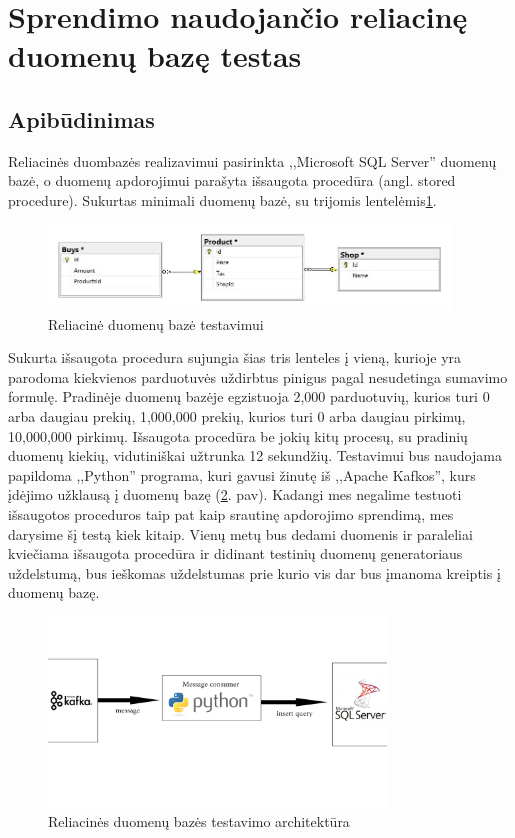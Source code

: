\documentclass{VUMIFPSkursinis}
\begin{document}
\section{Sprendimo naudojančio reliacinę duomenų bazę testas}

\subsection{Apibūdinimas}

Reliacinės duombazės realizavimui pasirinkta ,,Microsoft SQL Server'' duomenų bazė, o duomenų apdorojimui parašyta išsaugota procedūra (angl. stored procedure).
Sukurtas minimali duomenų bazė, su trijomis lentelėmis\ref{fig:dbdiagram}.
\begin{figure}[!htbp]
    \centering
    \includegraphics[width=0.95\textwidth]{img/dbdiagram.jpg}
    \caption{Reliacinė duomenų bazė testavimui}
    \label{fig:dbdiagram}
\end{figure}

Sukurta išsaugota procedura sujungia šias tris lenteles į vieną, kurioje yra parodoma kiekvienos parduotuvės uždirbtus pinigus pagal nesudetinga sumavimo formulę.
Pradinėje duomenų bazėje egzistuoja 2,000 parduotuvių, kurios turi 0 arba daugiau prekių, 1,000,000 prekių, kurios turi 0 arba daugiau pirkimų, 10,000,000 pirkimų.
Išsaugota procedūra be jokių kitų procesų, su pradinių duomenų kiekių, vidutiniškai užtrunka 12 sekundžių. Testavimui bus naudojama papildoma ,,Python'' programa,
kuri gavusi žinutę iš ,,Apache Kafkos'', kurs įdėjimo užklausą į duomenų bazę (\ref{fig:generator}. pav). Kadangi mes negalime testuoti išsaugotos proceduros taip 
pat kaip srautinę apdorojimo sprendimą, mes darysime šį testą kiek kitaip. Vienų metų bus dedami duomenis ir paraleliai kviečiama išsaugota procedūra ir didinant 
testinių duomenų generatoriaus uždelstumą, bus ieškomas uždelstumas prie kurio vis dar bus įmanoma kreiptis į duomenų bazę.

\begin{figure}[!htbp]
    \centering
    \includegraphics[width=0.8\textwidth]{img/dbms.jpg}
    \caption{Reliacinės duomenų bazės testavimo architektūra}
    \label{fig:generator}
\end{figure}
\end{document}
